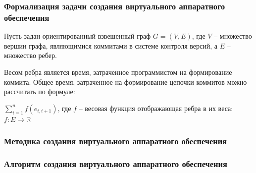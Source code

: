 \begin{frame}%
    \frametitle{Формализация задачи создания виртуального аппаратного обеспечения}
    Пусть задан ориентированный взвешенный граф $G = (V,E)$,
    где $V$ -- множество вершин графа, являющимися коммитами
    в системе контроля версий, а $E$ -- множество ребер.

    Весом ребра является время, затраченное программистом на
    формирование коммита. Общее время, затраченное на
    формирование цепочки коммитов можно рассчитать по
    формуле:

    $\sum_{i=1}^{n} f(e_{i,i+1})$, где $f$ -- весовая функция
    отображающая ребра в их веса: $f : E \rightarrow \mathbb{R}$
\end{frame}


\begin{frame}%
    \frametitle{Методика создания виртуального аппаратного обеспечения}
    \begin{figure}[!htbp]
        \hspace*{-5cm}
        \scalebox{0.7}{
            
        }
    \end{figure}
\end{frame}


\begin{frame}%
    \frametitle{Алгоритм создания виртуального аппаратного обеспечения}
    \begin{figure}[!htbp]
        \hspace*{-5cm}
        \scalebox{0.56}{
            
        }
    \end{figure}
\end{frame}





